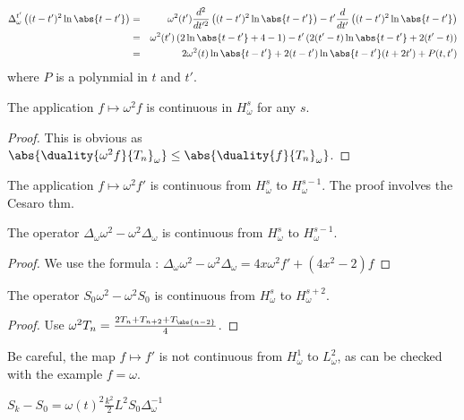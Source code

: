 \documentclass[]{article}
\begin{document}
\begin{Lem}
	\begin{eqnarray*}
		\Delta_{\omega}^{t'} \left((t-t')^2\ln\abs{t-t'}\right) &=& \omega^2(t')\frac{d^2}{dt'^2}\left((t-t')^2\ln\abs{t-t'}\right) - t' \frac{d}{dt'} \left((t-t')^2\ln\abs{t-t'}\right)\\
		&=&\omega^2(t')\left(2\ln\abs{t-t'} + 4 - 1\right) - t'\left(2(t'-t)\ln\abs{t-t'} + 2(t'-t)\right)\\
		&=&2\omega^2(t)\ln\abs{t-t'} + 2(t-t')\ln\abs{t-t'}(t + 2t') + P(t,t')
	\end{eqnarray*}
	where $P$ is a polynmial in $t$ and $t'$. 
\end{Lem}
\begin{Lem}
	The application $f \mapsto \omega^2 f$ is continuous in $H^s_{\omega}$ for any $s$. 
	\begin{proof}
		This is obvious as $\abs{\duality{\omega^2f}{T_n}_{\omega}} \leq  \abs{\duality{f}{T_n}_{\omega}}$.
	\end{proof}
\end{Lem}
\begin{Lem}
	The application $f \mapsto \omega^2 f'$ is continuous from $H^s_\omega$ to $H^{s-1}_\omega$.
	The proof involves the Cesaro thm. 
\end{Lem}
\begin{Lem}
	The operator $\Delta_{\omega}\omega^2 - \omega^2 \Delta_{\omega}$ is continuous from $H_{\omega}^s$ to $H_{\omega}^{s-1}$. 
	\begin{proof}
		We use the formula : $\Delta_{\omega}\omega^2 - \omega^2 \Delta_{\omega} = 4x\omega^2f' + (4x^2 - 2)f$
	\end{proof}
\end{Lem}
\begin{Lem}
	The operator $S_0\omega^2 - \omega^2S_0$ is continuous from $H^s_{\omega}$ to $H^{s+2}_\omega$.
	\begin{proof}
		Use $\omega^2 T_n = \frac{2T_n + T_{n+2} + T_{\abs{n-2}}}{4}$.
	\end{proof} 
\end{Lem}
Be careful, the map $f\mapsto f'$ is not continuous from $H^1_{\omega}$ to $L^2_{\omega}$, as can be checked with the example $f = \omega$. 
\begin{Lem}
	$S_k - S_0 = \omega(t)^2\frac{k^2}{2}L^2 S_0 \Delta_{\omega}^{-1}$ 
\end{Lem}


\end{document}
